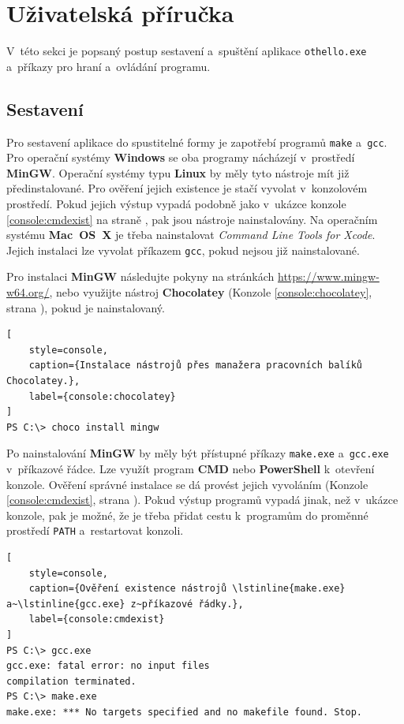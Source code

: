 \section{Uživatelská příručka}

V~této sekci je popsaný postup sestavení a~spuštění aplikace \lstinline{othello.exe} a~příkazy pro hraní a~ovládání programu.

\subsection{Sestavení} \label{sec:manual_build}

Pro sestavení aplikace do spustitelné formy je zapotřebí programů \lstinline{make} a~\lstinline{gcc}. Pro operační systémy \textbf{Windows} se oba programy nácházejí v~prostředí \textbf{MinGW}. Operační systémy typu \textbf{Linux} by měly tyto nástroje mít již předinstalované. Pro ověření jejich existence je stačí vyvolat v~konzolovém prostředí. Pokud jejich výstup vypadá podobně jako v~ukázce konzole \ref{console:cmdexist} na straně \pageref{console:cmdexist}, pak jsou nástroje nainstalovány. Na operačním systému \textbf{Mac~OS~X} je třeba nainstalovat \emph{Command Line Tools for Xcode}. Jejich instalaci lze vyvolat příkazem \lstinline{gcc}, pokud nejsou již nainstalované.

Pro instalaci \textbf{MinGW} následujte pokyny na stránkách \url{https://www.mingw-w64.org/}, nebo využijte nástroj \textbf{Chocolatey} (Konzole \ref{console:chocolatey}, strana \pageref{console:chocolatey}), pokud je nainstalovaný.

\begin{lstlisting}[
	style=console,
	caption={Instalace nástrojů přes manažera pracovních balíků Chocolatey.},
	label={console:chocolatey}
]
PS C:\> choco install mingw
\end{lstlisting}

Po nainstalování \textbf{MinGW} by měly být přístupné příkazy \lstinline{make.exe} a~\lstinline{gcc.exe} v~příkazové řádce. Lze využít program \textbf{CMD} nebo \textbf{PowerShell} k~otevření konzole. Ověření správné instalace se dá provést jejich vyvoláním (Konzole \ref{console:cmdexist}, strana \pageref{console:cmdexist}). Pokud výstup programů vypadá jinak, než v~ukázce konzole, pak je možné, že je třeba přidat cestu k~programům do proměnné prostředí \lstinline{PATH} a~restartovat konzoli.

\begin{lstlisting}[
	style=console,
	caption={Ověření existence nástrojů \lstinline{make.exe} a~\lstinline{gcc.exe} z~příkazové řádky.},
	label={console:cmdexist}
]
PS C:\> gcc.exe
gcc.exe: fatal error: no input files
compilation terminated.
PS C:\> make.exe
make.exe: *** No targets specified and no makefile found. Stop.
\end{lstlisting}

